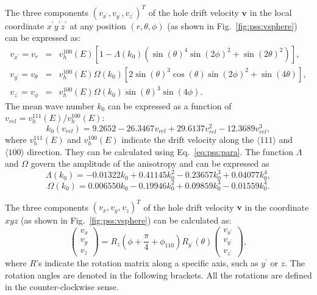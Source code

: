 The three components $(v_{x^{\prime}}, v_{y^{\prime}}, v_{z^{\prime}})^{T}$ of the hole drift velocity $\mathbf{v}$ in the local coordinate $x^{\prime}y^{\prime}z^{\prime}$ at any position $(r, \theta, \phi)$ (as shown in Fig.~\ref{fig:pss:vsphere}) can be expressed as:
\begin{equation}
  \label{eq:pss:vsphere}
  \begin{array}{rcl}
   v_{x^{\prime}} = v_{r} &=& v^{100}_{h}(E)[1-\Lambda(k_{0})(\sin(\theta)^{4}\sin(2\phi)^{2} + \sin(2\theta)^{2})],\\
   v_{y^{\prime}} = v_{\theta} &=& v^{100}_{h}(E)\Omega(k_{0})[2\sin(\theta)^{3}\cos(\theta)\sin(2\phi)^{2} + \sin(4\theta)],\\
    v_{z^{\prime}} = v_{\phi} &=& v^{100}_{h}(E)\Omega(k_{0})\sin(\theta)^{3}\sin(4\phi).
  \end{array}
\end{equation}
The mean wave number $k_{0}$ can be expressed as a function of $v_{rel} = v^{111}_{h}(E)/v^{100}_{h}(E)$:
\begin{equation}
  \label{eq:pss:k0}
   k_{0}(v_{rel}) = 9.2652 - 26.3467v_{rel} + 29.6137v_{rel}^{2} - 12.3689v_{rel}^{3},
\end{equation}
where $v^{111}_{h}(E)$ and $v^{100}_{h}(E)$ indicate the drift velocity along the $\langle111\rangle$ and $\langle100\rangle$ direction. They can be calculated using Eq.~\ref{eq:pss:para}. The function $\Lambda$ and $\Omega$ govern the amplitude of the anisotropy and can be expressed as
\begin{equation}
  \label{eq:pss:lamb}
   \Lambda(k_{0}) = -0.01322k_{0} + 0.41145k_{0}^{2} - 0.23657k_{0}^{3} + 0.04077k_{0}^{4},
\end{equation}
\begin{equation}
  \label{eq:pss:ome}
   \Omega(k_{0}) = 0.006550k_{0} - 0.19946k_{0}^{2} + 0.09859k_{0}^{3} - 0.01559k_{0}^{4}.
\end{equation}

The three components $(v_{x}, v_{y}, v_{z})^{T}$ of the hole drift velocity $\mathbf{v}$ in the coordinate $xyz$ (as shown in Fig.~\ref{fig:pss:vsphere}) can be calculated as:
\begin{equation}
  \label{eq:pss:v2v}  
  \left(
    \begin{array}{c}
      v_{x} \\ v_{y} \\ v_{z}
    \end{array}
\right) = R_{z}(\phi + \frac{\pi}{4} + \phi_{110}) R_{y^{\prime}}(\theta) \left( 
    \begin{array}{c}
      v_{x^{\prime}} \\ v_{y^{\prime}} \\ v_{z^{\prime}}
    \end{array} \right),
\end{equation}
where $R$'s indicate the rotation matrix along a specific axis, such as $y^{\prime}$ or $z$. The rotation angles are denoted in the following brackets. All the rotations are defined in the counter-clockwise sense.



